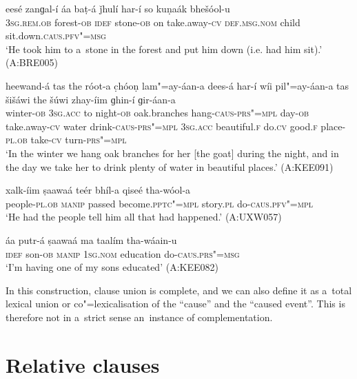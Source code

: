 \begin{exe}
\ex
\label{ex:13-184}
\gll eesé zanɡal-í áa baṭ-á ǰhulí har-í  so kuṇaák bhešóol-u \\
\textsc{3sg.rem.ob} forest-\textsc{ob} \textsc{idef} stone-\textsc{ob} on take.away-\textsc{cv} \textsc{def.msg.nom} child sit.down.\textsc{caus}.\textsc{pfv"=msg} \\
\glt `He took him to a~stone in the forest and put him down (i.e. had him sit).' (A:BRE005)

\ex
\label{ex:13-185}
\gll heewand-á tas the róot-a c̣hóoṇ  lam"=ay-áan-a dees-á har-í wíi
pil"=ay-áan-a tas šišáwi the šúwi zhay-íim  ɡhin-í ɡir-áan-a \\
winter-\textsc{ob}  \textsc{3sg.acc}  to night-\textsc{ob} oak.branches  hang-\textsc{caus}-\textsc{prs"=mpl} day-\textsc{ob} take.away-\textsc{cv} water  drink-\textsc{caus}-\textsc{prs"=mpl} \textsc{3sg.acc} beautiful.\textsc{f} do.\textsc{cv} good.\textsc{f} place-\textsc{pl.ob} take-\textsc{cv} turn-\textsc{prs"=mpl} \\
\glt `In the winter we hang oak branches for her [the goat] during the night, and in the day we take her to drink plenty of water in beautiful places.' (A:KEE091)

\ex
\label{ex:13-186}
\gll xalk-íim ṣaawaá teér bhíl-a qiseé  tha-wóol-a \\
people-\textsc{pl.ob} \textsc{manip} passed become.\textsc{pptc"=mpl} story.\textsc{pl} do-\textsc{caus}.\textsc{pfv"=mpl} \\
\glt `He had the people tell him all that had happened.' (A:UXW057)

\ex
\label{ex:13-187}
\gll áa putr-á ṣaawaá ma taalím tha-wáain-u  \\
\textsc{idef} son-\textsc{ob} \textsc{manip} \textsc{1sg.nom} education do-\textsc{caus}.\textsc{prs"=msg} \\
\glt `I'm having one of my sons educated' (A:KEE082) 
\end{exe}

In this construction, clause union is complete, and we can also define it as a~total lexical union \citep[75]{noonan1985} or co"=lexicalisation of the ``cause'' and the ``caused event''. This is therefore not in a~strict sense an~instance of complementation.


\section{Relative clauses}
\label{sec:13-6}

